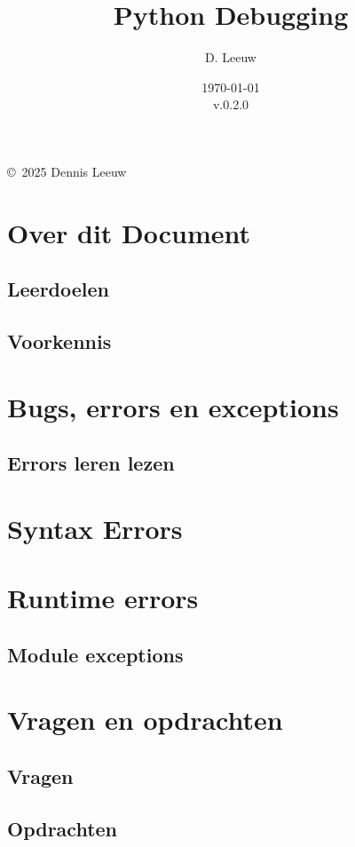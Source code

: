 \documentclass[a4paper,12pt,twoside,openright,titlepage]{article}
\author{D. Leeuw}
\title{Python Debugging}
\date{\today\\v.0.2.0}
\begin{document}

\maketitle

\copyright\ 2025 Dennis Leeuw\\




\section{Over dit Document}
\subsection{Leerdoelen}

\subsection{Voorkennis}




\section{Bugs, errors en exceptions}

\subsection{Errors leren lezen}


\section{Syntax Errors}


\section{Runtime errors}

\subsection{Module exceptions}


\section{Vragen en opdrachten}
\subsection{Vragen}

\subsection{Opdrachten}


\printindex
\end{document}
